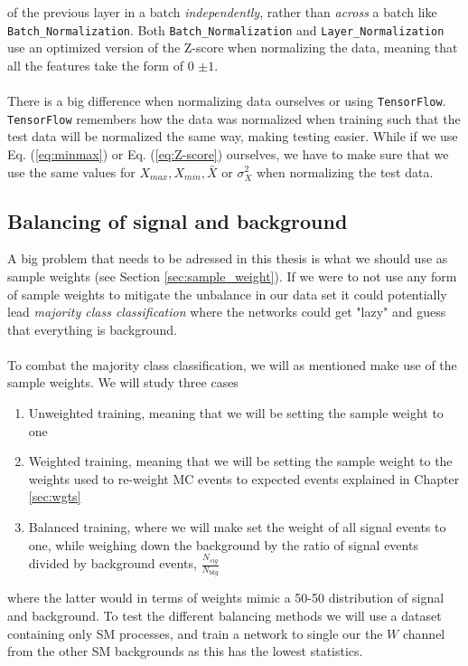 \documentclass[14pt, a4paper]{book}
\begin{document}
of the previous layer in a batch \textit{independently}, rather than \textit{across} a batch like \verb|Batch_Normalization|. Both \verb|Batch_Normalization| and \verb|Layer_Normalization| use an optimized version of the Z-score when normalizing the data, meaning that all the features 
take the form of 0 $\pm1$.\\
\\There is a big difference when normalizing data ourselves or using \verb|TensorFlow|. \verb|TensorFlow| remembers how the data was normalized when training such that the test data will be normalized the same way, making testing easier. While if we use Eq. (\ref{eq:minmax}) or 
Eq. (\ref{eq:Z-score}) ourselves, we have to make sure that we use the same values for $X_{max}, X_{min}, \bar{X}$ or $\sigma_X^2$ when normalizing the test data. 



\subsection{Balancing of signal and background}\label{sec:balance_NN}
A big problem that needs to be adressed in this thesis is what we should use as sample weights (see Section \ref{sec:sample_weight}). If we were to not use any form of sample weights to mitigate the unbalance in our data set it could potentially lead \textit{majority class classification} where the 
networks could get "lazy" and guess that everything is background. \\
\\To combat the majority class classification, we will as mentioned make use of the sample weights. We will study three cases
\begin{enumerate}
   \item Unweighted training, meaning that we will be setting the sample weight to one
   \item Weighted training, meaning that we will be setting the sample weight to the weights used to re-weight MC events to expected events explained in Chapter \ref{sec:wgts}
   \item Balanced training, where we will make set the weight of all signal events to one, while weighing down the background by the ratio of signal events divided by background events, $\frac{N_{sig}}{N_{bkg}}$ 
\end{enumerate}
where the latter would in terms of weights mimic a 50-50 distribution of signal and background. To test the different balancing methods we will use a dataset containing only SM processes, and train a network to single our the $W$ channel from the other SM backgrounds as this has the lowest statistics. 
\end{document}
